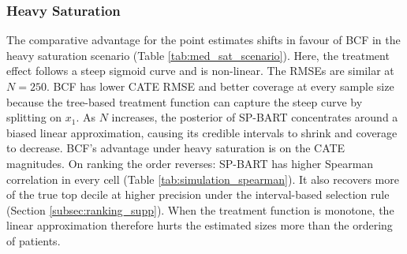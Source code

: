 \documentclass[12pt]{article}
\newcommand{\rev}[1]{\ifdefined\ReviewChanges{\color{revisionblue}#1}\else#1\fi}
\begin{document}
\subsubsection{Heavy Saturation}
The comparative advantage for the point estimates shifts in favour of BCF in the heavy saturation scenario (Table \ref{tab:med_sat_scenario}). Here, the treatment effect follows a steep sigmoid curve and is non-linear. The RMSEs are similar at $N=250$. BCF has lower CATE RMSE and better coverage at every sample size because the tree-based treatment function can capture the steep curve by splitting on $x_1$. As $N$ increases, the posterior of \rev{SP-BART} concentrates around a biased linear approximation, causing its credible intervals to shrink and coverage to decrease. BCF's advantage under heavy saturation is on the CATE magnitudes. On ranking the order reverses: \rev{SP-BART} has higher Spearman correlation in every cell (Table \ref{tab:simulation_spearman}). It also recovers more of the true top decile at higher precision under the interval-based selection rule (Section \ref{subsec:ranking_supp}). When the treatment function is monotone, the linear approximation therefore hurts the estimated sizes more than the ordering of patients.
\end{document}
